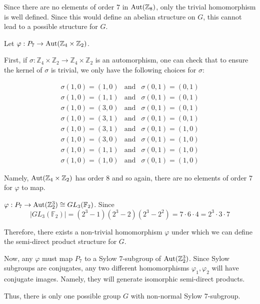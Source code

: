 \documentclass[12pt]{Qual}
\begin{document}
\begin{solution}
\begin{enumerate}[label=(\alph*)]
    Since there are no elements of order $7$ in $\text{Aut}(\mathbb{Z}_8)$, only the trivial homomorphism is well defined. Since this would define an abelian structure on $G$, this cannot lead to a possible structure for $G.$

     Let $\varphi:P_7\to\text{Aut}(\mathbb{Z}_4\times\mathbb{Z}_2)$.

    First, if $\sigma:\mathbb{Z}_4\times\mathbb{Z}_2\to\mathbb{Z}_4\times\mathbb{Z}_2$ is an automorphism, one can check that to ensure the kernel of $\sigma$ is trivial, we only have the following choices for $\sigma:$

    $$\begin{matrix}
    \sigma(1,0)=(1,0) &\text{and}& \sigma(0,1)=(0,1)\\
    \sigma(1,0)=(1,1) &\text{and}& \sigma(0,1)=(0,1)\\
    \sigma(1,0)=(3,0) &\text{and}& \sigma(0,1)=(0,1)\\
    \sigma(1,0)=(3,1) &\text{and}& \sigma(0,1)=(0,1)\\
    \sigma(1,0)=(3,1) &\text{and}& \sigma(0,1)=(1,0)\\
    \sigma(1,0)=(3,0) &\text{and}& \sigma(0,1)=(1,0)\\
    \sigma(1,0)=(1,1) &\text{and}& \sigma(0,1)=(1,0)\\
    \sigma(1,0)=(1,0) &\text{and}& \sigma(0,1)=(1,0)
    \end{matrix}$$

    Namely, $\text{Aut}(\mathbb{Z}_4\times\mathbb{Z}_2)$ has order $8$ and so again, there are no elements of order $7$ for $\varphi$ to map.

     $\varphi:P_7\to\text{Aut}(\mathbb{Z}_2^3)\cong GL_3(\mathbb{F}_2)$. Since $$|GL_3(\mathbb{F}_2)|=(2^3-1)(2^3-2)(2^3-2^2)=7\cdot6\cdot4=2^3\cdot 3\cdot 7$$

    Therefore, there exists a non-trivial homomorphism $\varphi$ under which we can define the semi-direct product structure for $G.$

    Now, any $\varphi$ must map $P_7$ to a Sylow $7$-subgroup of $\text{Aut}(\mathbb{Z}_2^3)$. Since Sylow subgroups are conjugates, any two different homomorphisms $\varphi_1,\varphi_2$ will have conjugate images. Namely, they will generate isomorphic semi-direct products.

    Thus, there is only one possible group $G$ with non-normal Sylow $7$-subgroup.


\end{enumerate}
\end{solution}
\end{document}
